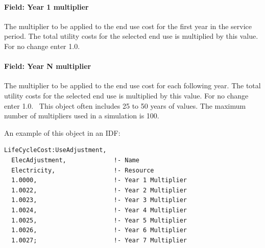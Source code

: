 \paragraph{Field: Year 1 multiplier}\label{field-year-1-multiplier}

The multiplier to be applied to the end use cost for the first year in the service period. The total utility costs for the selected end use is multiplied by this value. For no change enter 1.0.

\paragraph{Field: Year N multiplier}\label{field-year-n-multiplier}

The multiplier to be applied to the end use cost for each following year. The total utility costs for the selected end use is multiplied by this value. For no change enter 1.0.~ This object often includes 25 to 50 years of values. The maximum number of multipliers used in a simulation is 100.

An example of this object in an IDF:

\begin{lstlisting}
LifeCycleCost:UseAdjustment,
  ElecAdjustment,             !- Name
  Electricity,                !- Resource
  1.0000,                     !- Year 1 Multiplier
  1.0022,                     !- Year 2 Multiplier
  1.0023,                     !- Year 3 Multiplier
  1.0024,                     !- Year 4 Multiplier
  1.0025,                     !- Year 5 Multiplier
  1.0026,                     !- Year 6 Multiplier
  1.0027;                     !- Year 7 Multiplier
\end{lstlisting}
